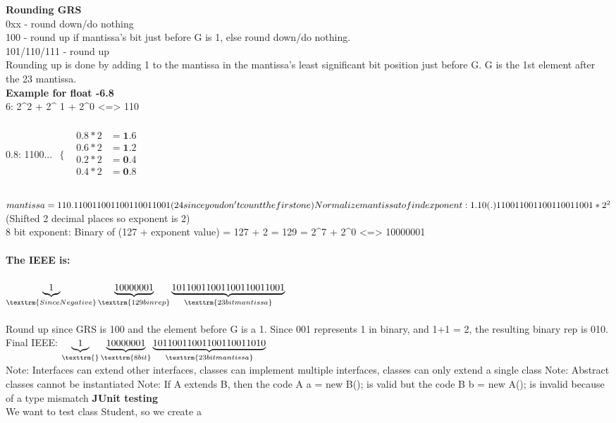 \documentclass{article}
\begin{document}
   
\textbf{Rounding GRS}\\ 
0xx - round down/do nothing\\
100 - round up if mantissa's bit just before G is 1, else round down/do nothing.\\
101/110/111 - round up\\
Rounding up is done by adding 1 to the mantissa in the mantissa's least significant bit position just before G. G is the 1st element after the 23 mantissa.\\
\textbf{Example for float -6.8}\\
6: 2^2 + 2^ 1 + 2^0 <=> 110\\\\
0.8: 1100...
$
\begin{array}{cc}
  \{ & 
    \begin{array}{cc}
      0.8*2 & =\textbf{1}.6 \\
      0.6*2 & =\textbf{1}.2 \\
      0.2*2 & =\textbf{0}.4 \\
      0.4*2 & =\textbf{0}.8 \\
    \end{array}
\end{array}
$\\\\
$
mantissa = 110.1100 1100 1100 1100 1100 1 (24 since you don't count the first one)\\
Normalize mantissa to find exponent: 1.10(.)110011001100110011001 * 2^2$ (Shifted 2 decimal places so exponent is 2)\\

8 bit exponent: Binary of (127 + exponent value) = 127 + 2 = 129 = 2^7 + 2^0 <=> 10000001\\\\
\textbf{The IEEE is: }\\\\
$ \underbrace{1}_\texttrm{Since Negative}  \underbrace{10000001}_\texttrm{129 bin rep}  \underbrace{10110011001100110011001}_\texttrm{23 bit mantissa}$\\\\
Round up since GRS is 100 and the element before G is a 1. Since 001 represents 1 in binary, and 1+1 = 2, the resulting binary rep is 010.\\
Final IEEE:  {$ \underbrace{1}_\texttrm{ }  \underbrace{10000001}_\texttrm{8 bit}  \underbrace{10110011001100110011010}_\texttrm{23 bit mantissa}$}\\
Note: Interfaces can extend other interfaces, classes can implement multiple interfaces, classes can only extend a single class
Note: Abstract classes cannot be instantiated
Note: If A extends B, then the code {A a = new B();} is valid but the code {B b = new A();} is invalid because of a type mismatch
\textbf{JUnit testing}\\
We want to test class Student, so we create a 
\end{document}
